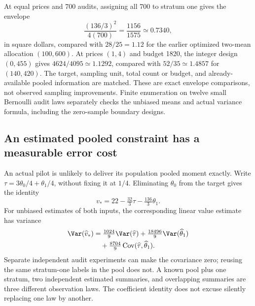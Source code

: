 At equal prices and 700 audits, assigning all 700 to stratum one gives the
envelope
\begin{equation}
 \frac{(136/3)^2}{4(700)}=\frac{1156}{1575}\simeq0.7340,
 \label{exec17:s7-pooled-count-comparison}
\end{equation}
in square dollars, compared with $28/25=1.12$ for the earlier optimized
two-mean allocation $(100,600)$. At prices $(1,4)$ and budget 1820, the
integer design $(0,455)$ gives $4624/4095\simeq1.1292$, compared with
$52/35\simeq1.4857$ for $(140,420)$. The target, sampling unit, total count
or budget, and already-available pooled information are matched. These are
exact envelope comparisons, not observed sampling improvements. Finite
enumeration on twelve small Bernoulli audit laws separately checks the
unbiased means and actual variance formula, including the zero-sample boundary
designs.\citep{exec17_s7_extension}

\subsection{An estimated pooled constraint has a measurable error cost}
\label{exec17:s7-noisy-pool}

An actual pilot is unlikely to deliver its population pooled moment exactly.
Write $\tau=3\theta_0/4+\theta_1/4$, without fixing it at $1/4$.
Eliminating $\theta_0$ from the target gives the identity
\begin{equation}
 v_*=22-\tfrac{32}{3}\tau-\tfrac{136}{3}\theta_1.
 \label{exec17:s7-noisy-value}
\end{equation}
For unbiased estimates of both inputs, the corresponding linear value
estimate has variance
\begin{equation}
 \begin{split}
  \Var(\widehat v_*)&=\tfrac{1024}{9}\Var(\widehat\tau)
       +\tfrac{18496}{9}\Var(\widehat\theta_1)\\
       &\quad+\tfrac{8704}{9}
          \operatorname{Cov}(\widehat\tau,\widehat\theta_1).
 \end{split}
 \label{exec17:s7-noisy-variance}
\end{equation}
Separate independent audit experiments can make the covariance zero; reusing
the same stratum-one labels in the pool does not. A known pool plus one
stratum, two independent estimated summaries, and overlapping summaries are
three different observation laws. The coefficient identity does not excuse
silently replacing one law by another.

